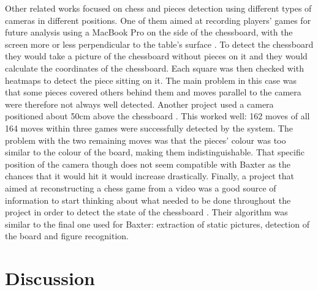 \documentclass{l4proj}
\begin{document}
Other related works focused on chess and pieces detection using different types of cameras in different positions. One of them aimed at recording players' games for future analysis using a MacBook Pro on the side of the chessboard, with the screen more or less perpendicular to the table's surface \cite{MacProject}. To detect the chessboard they would take a picture of the chessboard without pieces on it and they would calculate the coordinates of the chessboard. Each square was then checked with heatmaps to detect the piece sitting on it. The main problem in this case was that some pieces covered others behind them and moves parallel to the camera were therefore not always well detected. Another project used a camera positioned about 50cm above the chessboard \cite{PerpendicularCameraProject}. This worked well: 162 moves of all 164 moves within three games were successfully detected by the system. The problem with the two remaining moves was that the pieces' colour was too similar to the colour of the board, making them indistinguishable. That specific position of the camera though does not seem compatible with Baxter as the chances that it would hit it would increase drastically. Finally, a project that aimed at reconstructing a chess game from a video was a good source of information to start thinking about what needed to be done throughout the project in order to detect the state of the chessboard \cite{SimilarProject2}. Their algorithm was similar to the final one used for Baxter: extraction of static pictures, detection of the board and figure recognition. 

\section{Discussion} \label{Discussion}
\end{document}
